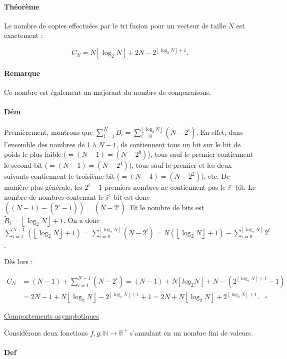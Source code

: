 \documentclass{article}
\newcommand{\floor}[1]{{\left\lfloor#1\right\rfloor}}
\begin{document}
			\paragraph{Théorème} Le nombre de copies effectuées par le tri fusion pour un vecteur de taille $N$ est exactement :

			\[C_N = N\floor{\log_2 N} + 2N - 2^{\floor{\log_2 N} + 1}.\]

			\paragraph{Remarque} Ce nombre est également un majorant du nombre de comparaisons.

			\paragraph{Dém} Premièrement, montrons que $\sum_{i=1}^N\widetilde B_i = \sum_{i=0}^{\floor{\log_2 N}}(N-2^i)$. En effet, dans l'ensemble des nombres de 1 à $N-1$,
			ils contiennent tous un bit sur le bit de poids le plus faible ($= (N-1) = (N-2^0)$), tous sauf le premier contiennent le second bit ($= (N-1) = (N-2^1)$), tous sauf le premier
			et les deux suivants contiennent le troisième bit ($= (N-4) = (N-2^2)$), etc. De manière plus générale, les $2^i-1$ premiers nombres ne contiennent pas le $i^e$ bit.
			Le nombre de nombres contenant le $i^e$ bit est donc $((N-1)-(2^i-1)) = (N-2^i)$. Et le nombre de bits est $\widetilde B_i = \floor {\log_2 N} + 1$. On a donc
			$\sum_{i=1}^{N-1}(\floor{\log_2 N} + 1) = \sum_{i=0}^{\floor{\log_2 N}}(N-2^i) = N(\floor{\log_2 N} + 1) - \sum_{i=0}^{\floor{\log_2 N}}2^i$.

			Dès lors :
			
			\begin{align*}
				C_N &= (N-1) + \sum_{i=1}^{N-1}(N-2^i) = (N-1) + N\floor{log_2 N} + N - (2^{\floor{\log_2 N} + 1} - 1) \\
					&= 2N - 1 + N\floor{\log_2 N} - 2^{\floor{\log_2 N}+1} + 1 = 2N + N\floor{\log_2 N} + 2^{\floor{\log_2 N}+1}. \;\;\;\square
			\end{align*}

			\underline{Comportements asymptotiques}

			Considérons deux fonctions $f, g : \mathbb N \to \mathbb R^+$ s'annulant en un nombre fini de valeurs.

			\paragraph{Def}
\end{document}
